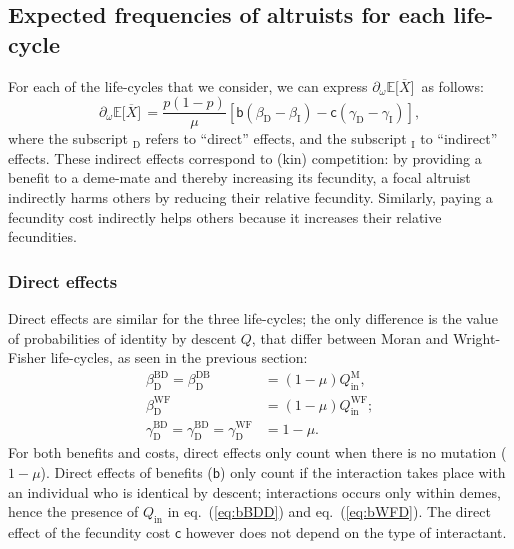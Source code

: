 \documentclass[11pt, letterpaper]{article}
\renewcommand{\eqref}[1]{\textup{{\normalfont eq.~(\ref{#1}}\normalfont)}}
\newcommand{\deriv}[2]{\partial_{#2}\!{#1}\,}
\newcommand{\Esp}[1]{\mathbb{E}\big[ #1\big]}%
\newcommand{\bb}{\mathsf{b}}
\newcommand{\cc}{\mathsf{c}}
\newcommand{\direct}{\mathrm{D}}
\newcommand{\indirect}{\mathrm{I}}
\newcommand{\Moran}{\textrm{M}}
\newcommand{\BD}{\textrm{BD}}
\newcommand{\DB}{\textrm{DB}}
\newcommand{\WF}{\textrm{WF}}
\newcommand{\Qin}{Q_{\textrm{in}}}
\begin{document}
\subsection{Expected frequencies of altruists for each life-cycle}

For each of the life-cycles that we consider, we can express $\deriv{\Esp{\overline{X}}}{\omega}$ as follows:
\begin{equation}\label{eq:dEXgeneric}
\deriv{\Esp{\overline{X}}}{\omega} = \frac{p (1-p)}{\mu} \left[ \bb \left( \beta_{\direct} - \beta_{\indirect} \right) - \cc \left( \gamma_{\direct} - \gamma_{\indirect} \right) \right],
\end{equation} 
where the subscript $_{\direct}$ refers to ``direct'' effects, and the subscript $_{\indirect}$ to ``indirect'' effects. These indirect effects correspond to (kin) competition: by providing a benefit to a deme-mate and thereby increasing its fecundity, a focal altruist indirectly harms others by reducing their relative fecundity. Similarly, paying a fecundity cost indirectly helps others because it increases their relative fecundities. 

\subsubsection{Direct effects}
Direct effects are similar for the three life-cycles; the only difference is the value of probabilities of identity by descent $Q$, that differ between Moran and Wright-Fisher life-cycles, as seen in the previous section:
%
\begin{subequations}\label{eq:directeffects}
\begin{align}
\beta_{\direct}^{\BD} = \beta_{\direct}^{\DB} &= \left( 1-\mu\right) \Qin^{\Moran}, \label{eq:bBDD}\\
\beta_{\direct}^{\WF} &= \left( 1-\mu\right) \Qin^{\WF}; \label{eq:bWFD}\\
%
%
\gamma_{\direct}^{\BD} = \gamma_{\direct}^{\BD} = \gamma_{\direct}^{\WF} &= 1-\mu.\label{eq:cBDD}
\end{align}
\end{subequations}
%
For both benefits and costs, direct effects only count when there is no mutation ($1-\mu$). Direct effects of benefits ($\bb$) only count if the interaction takes place with an individual who is identical by descent; interactions occurs only within demes, hence the presence of $\Qin$ in \eqref{eq:bBDD} and \eqref{eq:bWFD}. The direct effect of the fecundity cost $\cc$ however does not depend on the type of interactant. 
\end{document}
